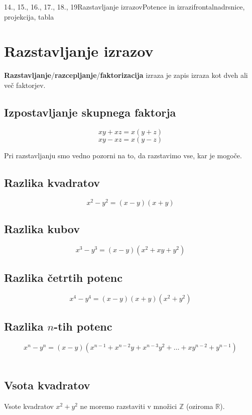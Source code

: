 \begin{priprava}{14., 15., 16., 17., 18., 19}{}{Razstavljanje izrazov}{Potence in izrazi}{frontalna}{drsnice, projekcija, tabla}


    \section{Razstavljanje izrazov}
                    
        \textbf{Razstavljanje}/\textbf{razcepljanje}/\textbf{faktorizacija} izraza je zapis izraza kot dveh ali več faktorjev.
                    
        \subsection*{Izpostavljanje skupnega faktorja}
                $$xy+ xz=x(y+ z)$$            
                $$xy- xz=x(y- z)$$            
            
        Pri razstavljanju smo vedno pozorni na to, da razstavimo vse, kar je mogoče.
        ~\newline
        
        \subsection*{Razlika kvadratov}
        $$x^2-y^2=(x-y)(x+y)$$
    

        \subsection*{Razlika kubov}
        $$ x^3-y^3=(x-y)(x^2+xy+y^2) $$
    

        \subsection*{Razlika četrtih potenc}
        $$x^4-y^4=(x-y)(x+y)(x^2+y^2)$$
    

        \subsection*{Razlika $n$-tih potenc}
        $$x^n-y^n=(x-y)(x^{n-1}+x^{n-2}y+x^{n-3}y^2+\ldots+xy^{n-2}+y^{n-1})$$
        ~\newline
    
        
        \subsection*{Vsota kvadratov}
        Vsote kvadratov $x^2+y^2$ ne moremo razstaviti v množici $\mathbb{Z}$ (oziroma $\mathbb{R}$).
    

\end{priprava}
